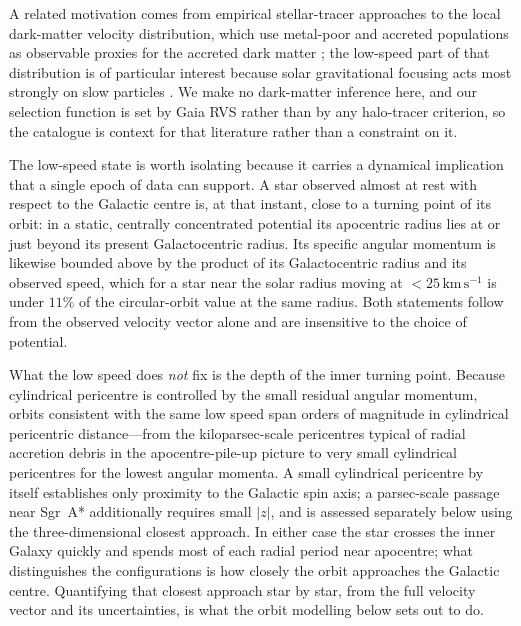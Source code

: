 \documentclass{aa}  %
\newcommand{\kms}{\ensuremath{\,\mathrm{km\,s^{-1}}}\xspace}
\begin{document}
A related motivation comes from empirical stellar-tracer approaches to
the local dark-matter velocity distribution, which use metal-poor and
accreted populations as observable proxies for the accreted dark matter
\citep{HerzogArbeitman2018PRL,HerzogArbeitman2018JCAP,
Necib2019Disequilibrium,Necib2019Fire,Evans2019SHM}; the low-speed part
of that distribution is of particular interest because solar
gravitational focusing acts most strongly on slow particles
\citep{Lee2014GF}.  We make no dark-matter inference here, and our
selection function is set by Gaia RVS rather than by any halo-tracer
criterion, so the catalogue is context for that literature rather than a
constraint on it.

The low-speed state is worth isolating because it carries a dynamical
implication that a single epoch of data can support.  A star observed
almost at rest with respect to the Galactic centre is, at that instant,
close to a turning point of its orbit: in a static, centrally
concentrated potential its apocentric radius lies at or just beyond its
present Galactocentric radius.  Its specific angular momentum is
likewise bounded above by the product of its Galactocentric radius and
its observed speed, which for a star near the solar radius moving at
$<25\kms$ is under $11\%$ of the circular-orbit value at the same
radius.  Both statements follow from the observed velocity vector alone
and are insensitive to the choice of potential.

What the low speed does \emph{not} fix is the depth of the inner turning
point.  Because cylindrical pericentre is controlled by the small
residual angular momentum, orbits consistent with the same low speed
span orders of magnitude in cylindrical pericentric distance---from the
kiloparsec-scale pericentres typical of radial accretion debris in the
apocentre-pile-up picture \citep{Deason2018} to very small cylindrical
pericentres for the lowest angular momenta.  A small cylindrical
pericentre by itself establishes only proximity to the Galactic spin
axis; a parsec-scale passage near Sgr~A* additionally requires small
$|z|$, and is assessed separately below using the three-dimensional
closest approach.  In either case the star crosses the inner Galaxy
quickly and spends most of each radial period near apocentre; what
distinguishes the configurations is how closely the orbit approaches the
Galactic centre.  Quantifying that closest approach star by star, from
the full velocity vector and its uncertainties, is what the orbit
modelling below sets out to do.
\end{document}
